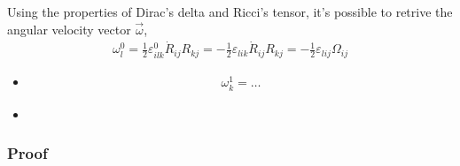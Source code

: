 \documentclass[letterpaper,10pt,english]{jupyterBook}
\begin{document}
\sphinxAtStartPar
Using the properties of Dirac’s delta and Ricci’s tensor, it’s possible to retrive the angular velocity vector \(\vec{\omega}\),
\begin{equation*}
\begin{split}\omega^0_l = \frac{1}{2} \varepsilon^0_{ilk} \dot{R}_{ij} R_{kj} = - \frac{1}{2} \varepsilon_{lik} \dot{R}_{ij} R_{kj} = -\frac{1}{2} \varepsilon_{lij} \Omega_{ij}\end{split}
\end{equation*}
\sphinxAtStartPar
{}
\begin{itemize}
\item {} \begin{equation*}
\begin{split}\omega^1_k = \dots\end{split}
\end{equation*}
\item {} 
\sphinxAtStartPar
{}

\end{itemize}
\subsubsection*{Proof}
\end{document}
